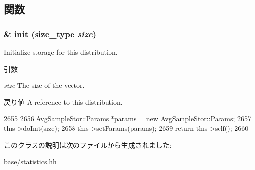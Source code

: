 \subsection{関数}
\hypertarget{classStats_1_1VectorAverageDeviation_ab861adc13eb968124467314d8d2ab8eb}{
\subsubsection[{init}]{\& init ({\bf size\_\-type} {\em size})}}
\label{classStats_1_1VectorAverageDeviation_ab861adc13eb968124467314d8d2ab8eb}
Initialize storage for this distribution. 
\begin{DoxyParams}{引数}
\item[{\em size}]The size of the vector. \end{DoxyParams}
\begin{DoxyReturn}{戻り値}
A reference to this distribution. 
\end{DoxyReturn}



\begin{DoxyCode}
2655     {
2656         AvgSampleStor::Params *params = new AvgSampleStor::Params;
2657         this->doInit(size);
2658         this->setParams(params);
2659         return this->self();
2660     }
\end{DoxyCode}


このクラスの説明は次のファイルから生成されました:\begin{DoxyCompactItemize}
\item 
base/\hyperlink{statistics_8hh}{statistics.hh}\end{DoxyCompactItemize}
